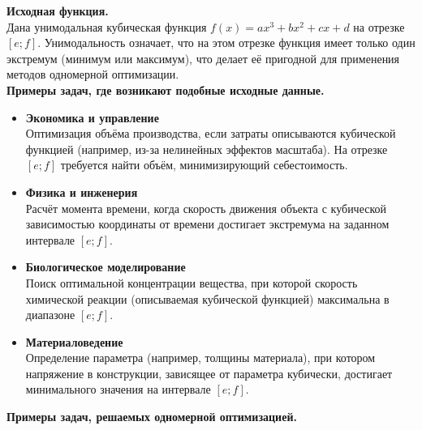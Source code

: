 \documentclass[a4paper, 14pt]{extarticle}
\begin{document}
\textbf{\normalsize Исходная функция.}\\[0.5em]

Дана унимодальная кубическая функция $f(x) = a x^3 + b x^2 + c x + d$ на 
отрезке $[e; f]$. Унимодальность означает, что на этом отрезке функция имеет 
только один экстремум (минимум или максимум), что делает её пригодной для применения 
методов одномерной оптимизации.\\
\vspace{20pt}
\textbf{\normalsize Примеры задач, где возникают подобные исходные данные.}\\[0.5em]

\begin{itemize}
    \item \textbf{Экономика и управление}\\ 
    Оптимизация объёма производства, если затраты описываются кубической функцией 
    (например, из-за нелинейных эффектов масштаба). 
    На отрезке $[e;f]$ требуется найти объём, минимизирующий себестоимость. \\

    \item \textbf{Физика и инженерия}\\ 
    Расчёт момента времени, когда скорость движения объекта с кубической 
    зависимостью координаты от времени достигает экстремума на заданном 
    интервале $[e;f]$. \\

    \item \textbf{Биологическое моделирование}\\ 
    Поиск оптимальной концентрации вещества, при которой скорость химической 
    реакции (описываемая кубической функцией) максимальна в диапазоне $[e;f]$. \\

    \item \textbf{Материаловедение}\\ 
    Определение параметра (например, толщины материала), при котором напряжение в 
    конструкции, зависящее от параметра кубически, достигает минимального значения на 
    интервале $[e;f]$. \\
\end{itemize}
\vspace{20pt}
\textbf{\normalsize Примеры задач, решаемых одномерной оптимизацией.}\\[0.5em]
\end{document}
